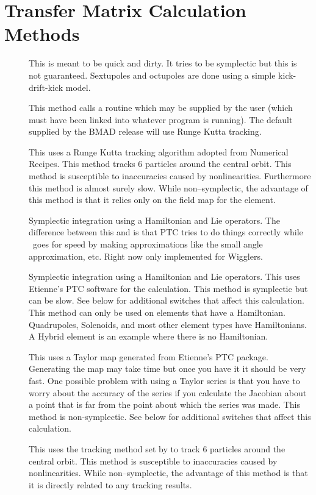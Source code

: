 \chapter{Transfer Matrix Calculation Methods}

\begin{description}

\item[]
This is meant to be quick and dirty. It tries to be symplectic but this
is not guaranteed. Sextupoles and octupoles are done using a simple
kick-drift-kick model.

\item[]
This method calls a routine  which may be supplied
by the user (which must have been linked into whatever program is
running).  The default  supplied by the BMAD release
will use Runge Kutta tracking. 

\item[]
This uses a Runge Kutta tracking algorithm adopted from Numerical Recipes.
This method tracks 6 particles around the central orbit. This method is
susceptible to inaccuracies caused by nonlinearities. Furthermore this method
is almost surely slow. While non--symplectic, the advantage of this method is
that it relies only on the field map for the element.

\item[]
Symplectic integration using a Hamiltonian and Lie operators. The
difference between this and  is that PTC tries to do things
correctly while \bmad\ goes for speed by making approximations like the small
angle approximation, etc. Right now only implemented for Wigglers.

\item[]
Symplectic integration using a Hamiltonian and Lie operators.
This uses Etienne's PTC software for the calculation.
This method is symplectic but can be slow. See below for additional switches
that affect this calculation. This method can only be used on elements that
have a Hamiltonian. Quadrupoles, Solenoids, and most other element types have
Hamiltonians. A Hybrid element is an example where there is no Hamiltonian.

\item[]
This uses a Taylor map generated from Etienne's PTC package. Generating
the map may take time but once you have it it should be very fast. One
possible problem with using a Taylor series is that you have to worry about
the accuracy of the series if you calculate the Jacobian about a point that is
far from the point about which the series was made. This method is
non-symplectic. See below for additional switches that affect this
calculation.

\item[]
This uses the tracking method set by  to track 6
particles around the central orbit. This method is susceptible to inaccuracies
caused by nonlinearities. While non--symplectic, the advantage of this method
is that it is directly related to any tracking results.

\end{description}

